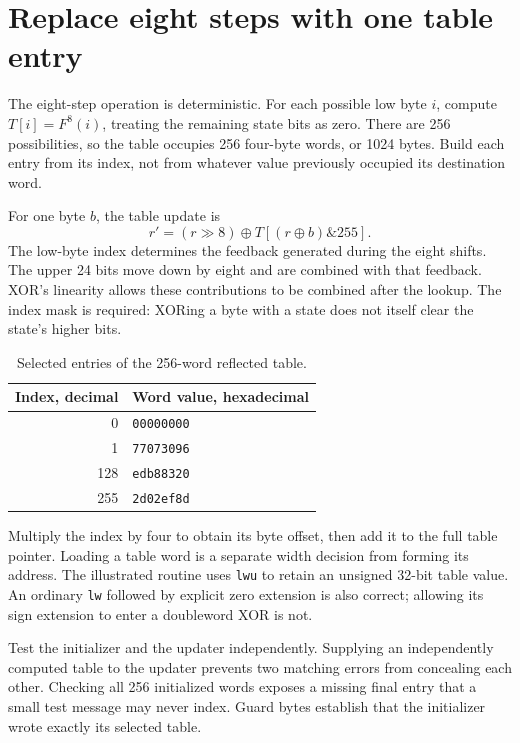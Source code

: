 \section{Replace eight steps with one table entry}
The eight-step operation is deterministic. For each possible low byte \(i\), compute
\(T[i]=F^8(i)\), treating the remaining state bits as zero. There are 256 possibilities,
so the table occupies 256 four-byte words, or 1024 bytes. Build each entry from its
index, not from whatever value previously occupied its destination word.

For one byte \(b\), the table update is
\[
  r'=(r\mathbin{\gg}8)\mathbin{\oplus}
  T[(r\mathbin{\oplus}b)\mathbin{\&}255].
\]
The low-byte index determines the feedback generated during the eight shifts. The
upper 24 bits move down by eight and are combined with that feedback. XOR's linearity
allows these contributions to be combined after the lookup. The index mask is required:
XORing a byte with a state does not itself clear the state's higher bits.

\begin{table}[htbp]
  \centering
  \caption{Selected entries of the 256-word reflected table.}
  \begin{tabular}{rl}
    \toprule
    Index, decimal & Word value, hexadecimal \\
    \midrule
    0              & \texttt{00000000}       \\
    1              & \texttt{77073096}       \\
    128            & \texttt{edb88320}       \\
    255            & \texttt{2d02ef8d}       \\
    \bottomrule
  \end{tabular}
\end{table}

Multiply the index by four to obtain its byte offset, then add it to the full table
pointer. Loading a table word is a separate width decision from forming its address.
The illustrated routine uses \texttt{lwu} to retain an unsigned 32-bit table value.
An ordinary \texttt{lw} followed by explicit zero extension is also correct; allowing
its sign extension to enter a doubleword XOR is not.

Test the initializer and the updater independently. Supplying an independently computed
table to the updater prevents two matching errors from concealing each other. Checking
all 256 initialized words exposes a missing final entry that a small test message may
never index. Guard bytes establish that the initializer wrote exactly its selected table.
